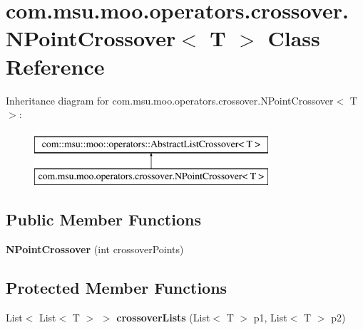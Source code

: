 \hypertarget{classcom_1_1msu_1_1moo_1_1operators_1_1crossover_1_1NPointCrossover_3_01T_01_4}{\section{com.\-msu.\-moo.\-operators.\-crossover.\-N\-Point\-Crossover$<$ T $>$ Class Reference}
\label{classcom_1_1msu_1_1moo_1_1operators_1_1crossover_1_1NPointCrossover_3_01T_01_4}
}
Inheritance diagram for com.\-msu.\-moo.\-operators.\-crossover.\-N\-Point\-Crossover$<$ T $>$\-:\begin{figure}[H]
\begin{center}
\leavevmode
\includegraphics[height=2.000000cm]{classcom_1_1msu_1_1moo_1_1operators_1_1crossover_1_1NPointCrossover_3_01T_01_4}
\end{center}
\end{figure}
\subsection*{Public Member Functions}
\begin{DoxyCompactItemize}
\item 
\hypertarget{classcom_1_1msu_1_1moo_1_1operators_1_1crossover_1_1NPointCrossover_3_01T_01_4_a0843f9c0c4c1771aa6e7a87fba6b65d5}{{\bfseries N\-Point\-Crossover} (int crossover\-Points)}\label{classcom_1_1msu_1_1moo_1_1operators_1_1crossover_1_1NPointCrossover_3_01T_01_4_a0843f9c0c4c1771aa6e7a87fba6b65d5}

\end{DoxyCompactItemize}
\subsection*{Protected Member Functions}
\begin{DoxyCompactItemize}
\item 
\hypertarget{classcom_1_1msu_1_1moo_1_1operators_1_1crossover_1_1NPointCrossover_3_01T_01_4_abc6162ab69e933f36ce4cd06b3d5fbbe}{List$<$ List$<$ T $>$ $>$ {\bfseries crossover\-Lists} (List$<$ T $>$ p1, List$<$ T $>$ p2)}\label{classcom_1_1msu_1_1moo_1_1operators_1_1crossover_1_1NPointCrossover_3_01T_01_4_abc6162ab69e933f36ce4cd06b3d5fbbe}

\end{DoxyCompactItemize}
